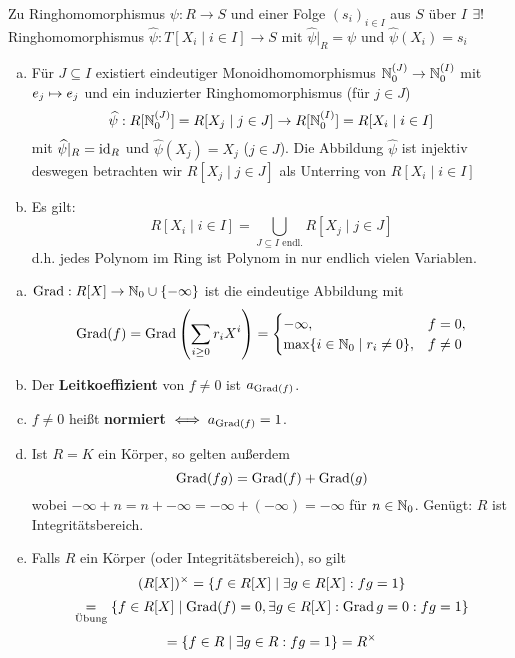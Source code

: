 \documentclass[a4paper]{report}
\begin{document}
\begin{satz} Zu Ringhomomorphismus $\psi : R \to S$ und einer Folge $(s_{i})_{i \in I}$ aus $S$ über $I$ $\ex !$ Ringhomomorphismus $\hat \psi : T[X_{i}\mid i \in I] \to S$ mit $\hat \psi|_{R} = \psi$ und $\hat \psi(X_{i}) = s_{i}$
\end{satz}

\begin{facts*}\item
\begin{enumerate}[(a)]
  \item Für $J \subseteq I$ existiert eindeutiger Monoidhomomorphismus $\Nn^{(J)} \to \Nn^{(I)}$ mit $e_{j} \mps e_{j}$ und ein induzierter Ringhomomorphismus (für $j \in J$) \[\hat \psi: R[\Nn^{(J)}] = R[X_{j} \mid j \in J] \to R[\Nn^{(I)}] = R[X_{i} \mid i \in I]\]
        mit $\hat \psi|_{R} = \id_{R}$ und $\hat \psi (X_{j}) = X_{j}$ ($j \in J$). Die Abbildung $\hat \psi$ ist injektiv deswegen betrachten wir $R[X_{j} \mid j \in J]$ als Unterring von $R[X_{i} \mid i \in I]$
  \item Es gilt: \[R[X_{i} \mid i \in I] = \bigcup_{J \subseteq I \text{ endl.}} R[X_{j} \mid j \in J]\]
        d.h. jedes Polynom im Ring ist Polynom in nur endlich vielen Variablen.
\end{enumerate}
\end{facts*}

\begin{defi}\item
\begin{enumerate}[(a)]
  \item $\grad : R[X] \to \Nn \cup \{- \infty\}$ ist die eindeutige Abbildung mit
        \[\grad(f) = \grad\l( \sum_{i \ge 0}r_{i}X^{i} \r) = \begin{cases} -\infty, & f = 0, \\
                                                          \max\{i \in \Nn \mid r_{i} \ne 0\}, & f \ne 0
                                                        \end{cases}\]
  \item Der \textbf{Leitkoeffizient} von $f \ne 0$ ist $a_{\grad(f)}$.
  \item $f \ne 0$ heißt \textbf{normiert} $\iff a_{\grad(f)} = 1$.
  \item Ist $R = K$ ein Körper, so gelten außerdem
        \[\grad(fg) = \grad(f) + \grad(g)\]
        wobei $-\infty + n = n + -\infty = - \infty + (- \infty) = - \infty$ für $n \in \Nn$. Genügt: $R$ ist Integritätsbereich.
  \item Falls $R$ ein Körper (oder Integritätsbereich), so gilt
        \[(R[X])\en = \{f \in R[X] \mid \ex g \in R[X] : fg = 1\}\]
        \[\ueb = \{f \in R[X] \mid \grad(f) = 0, \ex g \in R[X] : \grad g = 0 : fg = 1\} \]
        \[ = \{f \in R \mid \ex g \in R : fg = 1\} = R\en\]
\end{enumerate}
\end{defi}
\end{document}

